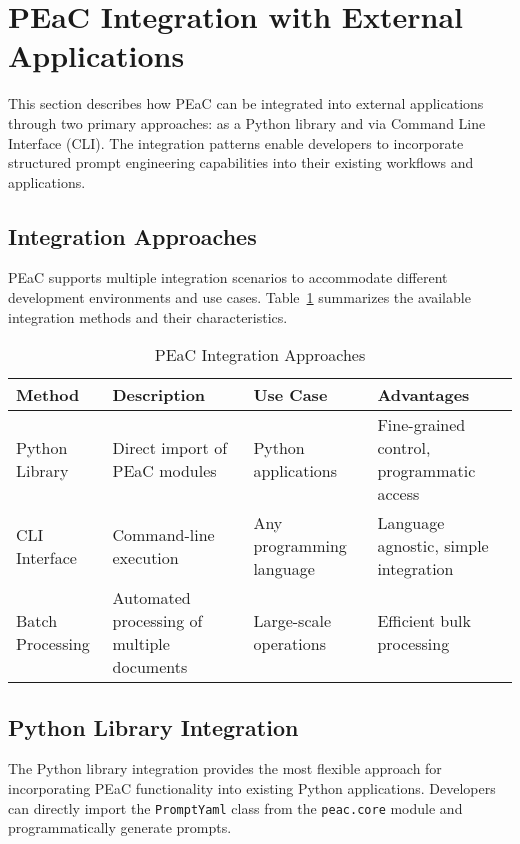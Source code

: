 \section{PEaC Integration with External Applications}

This section describes how PEaC can be integrated into external applications through two primary approaches: as a Python library and via Command Line Interface (CLI). The integration patterns enable developers to incorporate structured prompt engineering capabilities into their existing workflows and applications.

\subsection{Integration Approaches}

PEaC supports multiple integration scenarios to accommodate different development environments and use cases. Table~\ref{tab:integration-approaches} summarizes the available integration methods and their characteristics.

\begin{table}[htbp]
\centering
\caption{PEaC Integration Approaches}
\label{tab:integration-approaches}
\begin{tabular}{|l|p{4cm}|p{3cm}|p{3cm}|}
\hline
\textbf{Method} & \textbf{Description} & \textbf{Use Case} & \textbf{Advantages} \\
\hline
Python Library & Direct import of PEaC modules & Python applications & Fine-grained control, programmatic access \\
\hline
CLI Interface & Command-line execution & Any programming language & Language agnostic, simple integration \\
\hline
Batch Processing & Automated processing of multiple documents & Large-scale operations & Efficient bulk processing \\
\hline
\end{tabular}
\end{table}

\subsection{Python Library Integration}

The Python library integration provides the most flexible approach for incorporating PEaC functionality into existing Python applications. Developers can directly import the \texttt{PromptYaml} class from the \texttt{peac.core} module and programmatically generate prompts.

